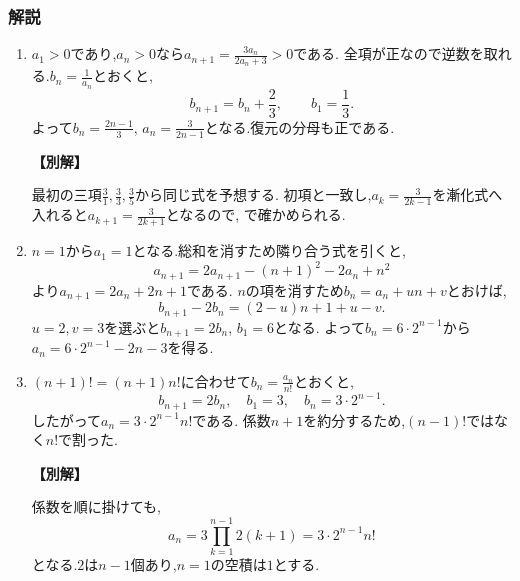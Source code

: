 \subsubsection{解説}\label{節：標準：解説}
\begin{enumerate}[label=\textbf{問\arabic*.},leftmargin=3.8em,format=\bookitemlink{practice-basic}{solution}{problem}]
  \item {}\BookMathLayout{}{\\}
    $a_1>0$であり,$a_n>0$なら$a_{n+1}=\frac{3a_n}{2a_n+3}>0$である.
    全項が正なので逆数を取れる.$b_n=\frac{1}{a_n}$とおくと,
    \[
      b_{n+1}=b_n+\frac23,\qquad b_1=\frac13.
    \]
    よって$b_n=\frac{2n-1}{3}$, $a_n=\frac{3}{2n-1}$となる.復元の分母も正である.
    \par\smallskip\noindent\textbf{【別解】}\par
    最初の三項$\frac{3}{1},\frac{3}{3},\frac{3}{5}$から同じ式を予想する.
    初項と一致し,$a_k=\frac{3}{2k-1}$を漸化式へ入れると$a_{k+1}=\frac{3}{2k+1}$となるので,
    で確かめられる.

  \item {}\BookMathLayout{}{\\}
    $n=1$から$a_1=1$となる.総和を消すため隣り合う式を引くと,
    \[
      a_{n+1}=2a_{n+1}-(n+1)^2-2a_n+n^2
    \]
    より$a_{n+1}=2a_n+2n+1$である.
    $n$の項を消すため$b_n=a_n+un+v$とおけば,
    \[
      b_{n+1}-2b_n=(2-u)n+1+u-v.
    \]
    $u=2,v=3$を選ぶと$b_{n+1}=2b_n$, $b_1=6$となる.
    よって$b_n=6\cdot2^{n-1}$から$a_n=6\cdot2^{n-1}-2n-3$を得る.

  \item {}\BookMathLayout{}{\\}
    $(n+1)!=(n+1)n!$に合わせて$b_n=\frac{a_n}{n!}$とおくと,
    \[
      b_{n+1}=2b_n,\quad b_1=3,\quad b_n=3\cdot2^{n-1}.
    \]
    したがって$a_n=3\cdot2^{n-1}n!$である.
    係数$n+1$を約分するため,$(n-1)!$ではなく$n!$で割った.
    \par\smallskip\noindent\textbf{【別解】}\par
    係数を順に掛けても,
    \[
      a_n=3\prod_{k=1}^{n-1}2(k+1)=3\cdot2^{n-1}n!
    \]
    となる.$2$は$n-1$個あり,$n=1$の空積は$1$とする.


\end{enumerate}
